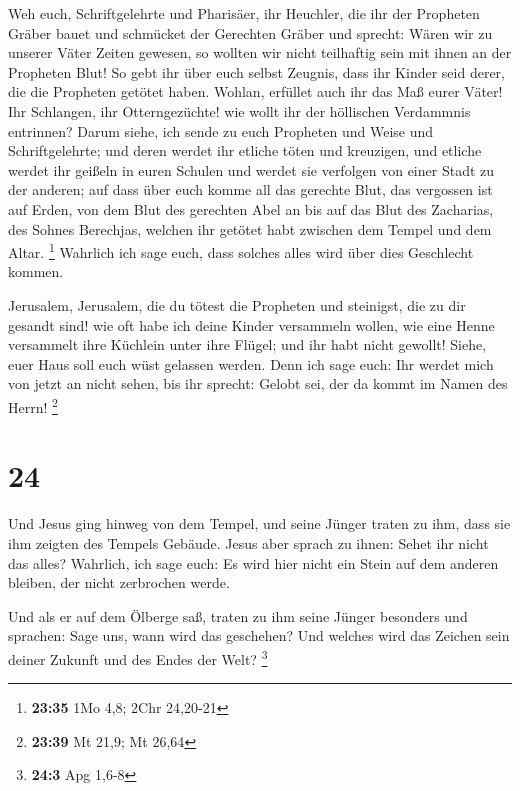  Weh euch, Schriftgelehrte und Pharisäer, ihr Heuchler, die
ihr der Propheten Gräber bauet und schmücket der Gerechten Gräber
 und sprecht: Wären wir zu unserer Väter Zeiten gewesen, so
wollten wir nicht teilhaftig sein mit ihnen an der Propheten Blut!
 So gebt ihr über euch selbst Zeugnis, dass ihr Kinder seid
derer, die die Propheten getötet haben.  Wohlan, erfüllet
auch ihr das Maß eurer Väter!  Ihr Schlangen, ihr
Otterngezüchte! wie wollt ihr der höllischen Verdammnis entrinnen?
 Darum siehe, ich sende zu euch Propheten und Weise und
Schriftgelehrte; und deren werdet ihr etliche töten und kreuzigen, und
etliche werdet ihr geißeln in euren Schulen und werdet sie verfolgen von
einer Stadt zu der anderen;  auf dass über euch komme all
das gerechte Blut, das vergossen ist auf Erden, von dem Blut des
gerechten Abel an bis auf das Blut des Zacharias, des Sohnes Berechjas,
welchen ihr getötet habt zwischen dem Tempel und dem Altar. \footnote{\textbf{23:35}
  1Mo 4,8; 2Chr 24,20-21}  Wahrlich ich sage euch, dass
solches alles wird über dies Geschlecht kommen.

 Jerusalem, Jerusalem, die du tötest die Propheten und
steinigst, die zu dir gesandt sind! wie oft habe ich deine Kinder
versammeln wollen, wie eine Henne versammelt ihre Küchlein unter ihre
Flügel; und ihr habt nicht gewollt!  Siehe, euer Haus soll
euch wüst gelassen werden.  Denn ich sage euch: Ihr werdet
mich von jetzt an nicht sehen, bis ihr sprecht: Gelobt sei, der da kommt
im Namen des Herrn! \footnote{\textbf{23:39} Mt 21,9; Mt 26,64}

\hypertarget{section-12}{%
\section{24}\label{section-12}}

 Und Jesus ging hinweg von dem Tempel, und seine Jünger
traten zu ihm, dass sie ihm zeigten des Tempels Gebäude. 
Jesus aber sprach zu ihnen: Sehet ihr nicht das alles? Wahrlich, ich
sage euch: Es wird hier nicht ein Stein auf dem anderen bleiben, der
nicht zerbrochen werde.

 Und als er auf dem Ölberge saß, traten zu ihm seine Jünger
besonders und sprachen: Sage uns, wann wird das geschehen? Und welches
wird das Zeichen sein deiner Zukunft und des Endes der Welt? \footnote{\textbf{24:3}
  Apg 1,6-8}

